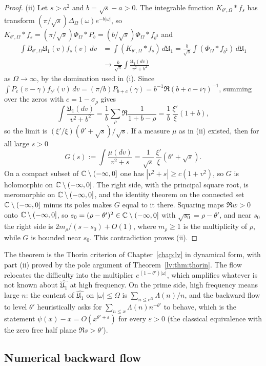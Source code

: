 \begin{proof}
(ii) Let $s>a^2$ and $b=\sqrt s-a>0$. The integrable function $K_{\theta',\Omega}*f_s$ has transform $(\pi/\sqrt s)\Delta_\Omega(\omega)e^{-b|\omega|}$, so $K_{\theta',\Omega}*f_s=(\pi/\sqrt s)\Phi_\Omega*P_b=(b/\sqrt s)\Phi_\Omega*f_{b^2}$ and
\[
\begin{split}\int B_{\theta',\Omega}\mathfrak U_1(v)f_s(v)\,dv&=\int(K_{\theta',\Omega}*f_s)\,d\mathfrak U_1=\frac b{\sqrt s}\int(\Phi_\Omega*f_{b^2})\,d\mathfrak U_1\\&\longrightarrow\frac b{\sqrt s}\int\frac{\mathfrak U_1(dv)}{v^2+b^2}\end{split}
\]
as $\Omega\to\infty$, by the domination used in (i). Since $\int P_c(v-\gamma)f_{b^2}(v)\,dv=(\pi/b)P_{b+c}(\gamma)=b^{-1}\Re(b+c-i\gamma)^{-1}$, summing over the zeros with $c=1-\sigma_\rho$ gives
\[
\int\frac{\mathfrak U_1(dv)}{v^2+b^2}=\frac1b\sum_\rho\Re\frac1{1+b-\rho}=\frac1b\,\frac{\xi'}{\xi}(1+b),
\]
so the limit is $(\xi'/\xi)(\theta'+\sqrt s)/\sqrt s$. If a measure $\mu$ as in (ii) existed, then for all large $s>0$
\[
G(s):=\int\frac{\mu(dv)}{v^2+s}=\frac1{\sqrt s}\,\frac{\xi'}{\xi}(\theta'+\sqrt s).
\]
On a compact subset of $\mathbb{C}\setminus(-\infty,0]$ one has $|v^2+s|\ge c(1+v^2)$, so $G$ is holomorphic on $\mathbb{C}\setminus(-\infty,0]$. The right side, with the principal square root, is meromorphic on $\mathbb{C}\setminus(-\infty,0]$, and the identity theorem on the connected set $\mathbb{C}\setminus(-\infty,0]$ minus its poles makes $G$ equal to it there. Squaring maps $\Re w>0$ onto $\mathbb{C}\setminus(-\infty,0]$, so $s_0=(\rho-\theta')^2\in\mathbb{C}\setminus(-\infty,0]$ with $\sqrt{s_0}=\rho-\theta'$, and near $s_0$ the right side is $2m_\rho/(s-s_0)+O(1)$, where $m_\rho\ge1$ is the multiplicity of $\rho$, while $G$ is bounded near $s_0$. This contradiction proves (ii).
\end{proof}

The theorem is the Thorin criterion of Chapter~\ref{chap:lv} in dynamical form, with part (ii) proved by the pole argument of Theorem~\ref{lv:thm:thorin}. The flow relocates the difficulty into the multiplier $e^{(1-\theta')|\omega|}$, which amplifies whatever is not known about $\widehat{\mathfrak U_1}$ at high frequency. On the prime side, high frequency means large $n$: the content of $\widehat{\mathfrak U_1}$ on $|\omega|\le\Omega$ is $\sum_{n\le e^\Omega}\Lambda(n)/n$, and the backward flow to level $\theta'$ heuristically asks for $\sum_{n\le x}\Lambda(n)n^{-\theta'}$ to behave, which is the statement $\psi(x)-x=O(x^{\theta'+\varepsilon})$ for every $\varepsilon>0$ (the classical equivalence with the zero free half plane $\Re s>\theta'$).

\subsection{Numerical backward flow}\label{lo:sec:numflow}

